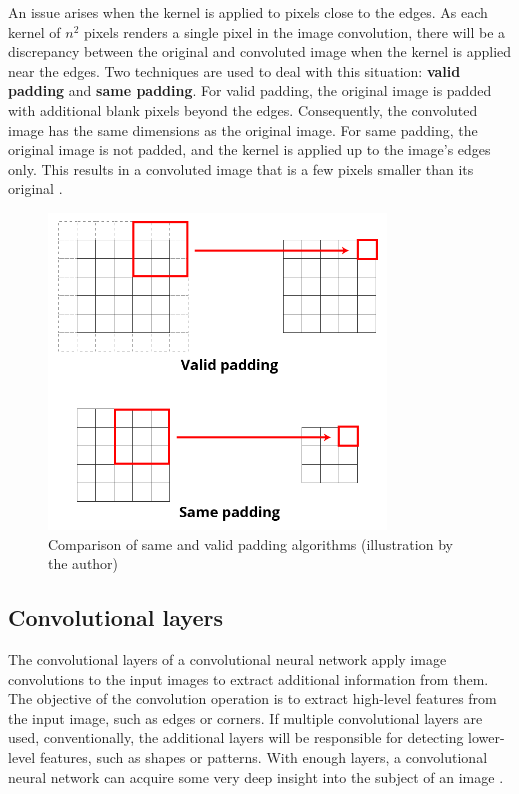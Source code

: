 ﻿\documentclass[12pt,a4paper,notitlepage]{article}
\begin{document}
An issue arises when the kernel is applied to pixels close to the edges. As each kernel of \(n^2\) pixels renders a single pixel in the image convolution, there will be a discrepancy between the original and convoluted image when the kernel is applied near the edges. Two techniques are used to deal with this situation: \textbf{valid padding} and \textbf{same padding}. For valid padding, the original image is padded with additional blank pixels beyond the edges. Consequently, the convoluted image has the same dimensions as the original image. For same padding, the original image is not padded, and the kernel is applied up to the image's edges only. This results in a convoluted image that is a few pixels smaller than its original \cite{sanderson_convolutions_2020}.
\begin{figure}[htbp]
 \centering
  \includegraphics[width=0.80\textwidth]{images/padding-illustration.png}
 \caption{Comparison of same and valid padding algorithms (illustration by the author)}
 \label{fig:padding-illustration}
\end{figure}

\subsection{Convolutional layers}
The convolutional layers of a convolutional neural network apply image convolutions to the input images to extract additional information from them. The objective of the convolution operation is to extract high-level features from the input image, such as edges or corners. If multiple convolutional layers are used, conventionally, the additional layers will be responsible for detecting lower-level features, such as shapes or patterns. With enough layers, a convolutional neural network can 
acquire some very deep insight into the subject of an image \cite{saha_comprehensive_2018}.
\end{document}
